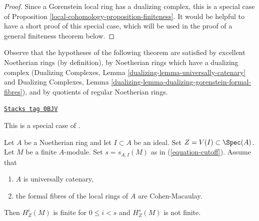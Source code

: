 \begin{proof}
Since a Gorenstein local ring has a dualizing complex,
this is a special case of Proposition \ref{local-cohomology-proposition-finiteness}.
It would be helpful to have a short proof of this special case,
which will be used in the proof of a general finiteness theorem below.
\end{proof}

Observe that the hypotheses of the following theorem are satisfied
by excellent Noetherian rings (by definition),
by Noetherian rings which have a dualizing complex
(Dualizing Complexes, Lemma \ref{dualizing-lemma-universally-catenary} and
Dualizing Complexes, Lemma
\ref{dualizing-lemma-dualizing-gorenstein-formal-fibres}), and
by quotients of regular Noetherian rings.

\begin{theorem}[Finiteness]
\label{local-cohomology-theorem-finiteness}
\href{https://stacks.math.columbia.edu/tag/0BJV}{\texttt{Stacks tag 0BJV}}

\begin{reference}
This is a special case of \cite[Satz 2]{Faltings-finiteness}.
\end{reference}
Let $A$ be a Noetherian ring and let $I \subset A$ be an ideal.
Set $Z = V(I) \subset \Spec(A)$. Let $M$ be a finite $A$-module.
Set $s = s_{A, I}(M)$ as in (\ref{equation-cutoff}).
Assume that
\begin{enumerate}
\item $A$ is universally catenary,
\item the formal fibres of the local rings of $A$ are Cohen-Macaulay.
\end{enumerate}
Then $H^i_Z(M)$ is finite for $0 \leq i < s$ and
$H^s_Z(M)$ is not finite.
\end{theorem}

